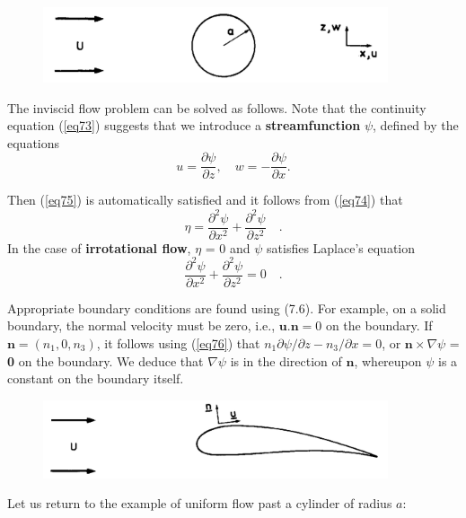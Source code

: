\documentclass[twoside,a4paper,11pt]{report}
\begin{document}
\begin{figure}[htbp]
\centerline{\includegraphics[width=4in]{Section71.pdf}}
\label{fig1}
\end{figure}

The inviscid flow problem can be solved as follows. Note that the continuity 
equation (\ref{eq73}) suggests that we introduce a \textbf{streamfunction} $\psi $, 
defined by the equations 
\[ u=\frac{\partial \psi }{\partial z}, \quad w=-\frac{\partial \psi }{\partial 
x}. \label{eq76} \]

Then (\ref{eq75}) is automatically satisfied and it follows from (\ref{eq74}) that
\begin{equation}
\eta =\frac{\partial ^2\psi }{\partial x^2}+\frac{\partial ^2\psi 
}{\partial z^2}\quad .
\end{equation}
In the case of \textbf{irrotational flow}, $\eta $ = 0 and $\psi $ satisfies 
Laplace's equation
\begin{equation}
\label{eq77}
\frac{\partial ^2\psi }{\partial x^2}+\frac{\partial ^2\psi }{\partial 
z^2}=0\quad .
\end{equation}

Appropriate boundary conditions are found using (7.6). For example, on a 
solid boundary, the normal velocity must be zero, i.e., $ \textbf{u} . 
\textbf{n} = 0$ on the boundary. If $ \textbf{n} = (n_{1}, 0, n_{3})$, it 
follows using (\ref{eq76}) that $n_1 {\partial \psi } /
{\partial z-n_3 } / {\partial x}=0$, or 
$\textbf{n} \times  \nabla \psi $ = \textbf{0} on the boundary. We 
deduce that $\nabla \psi $ is in the direction of  $\textbf{n}$, whereupon 
$\psi $ is a constant on the boundary itself.

\begin{figure}[htbp]
\centerline{\includegraphics[width=4in]{Section72.pdf}}
\label{fig2}
\end{figure}

Let us return to the example of uniform flow past a cylinder of radius $a$: 
\end{document}
